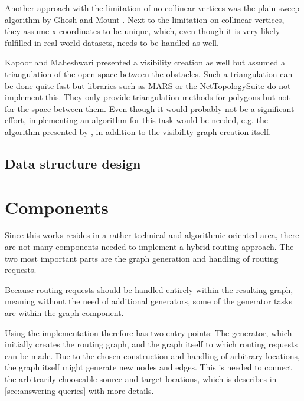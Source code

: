 			Another approach with the limitation of no collinear vertices was the plain-sweep algorithm by Ghosh and Mount \cite{ghosh-output-sensitive-vgraph}.
			Next to the limitation on collinear vertices, they assume x-coordinates to be unique, which, even though it is very likely fulfilled in real world datasets, needs to be handled as well.
			
			Kapoor and Maheshwari presented a visibility creation as well \cite{kapoor-shortest-path-vgraph} but assumed a triangulation of the open space between the obstacles.
			Such a triangulation can be done quite fast but libraries such as MARS or the NetTopologySuite do not implement this.
			They only provide triangulation methods for polygons but not for the space between them.
			Even though it would probably not be a significant effort, implementing an algorithm for this task would be needed, e.g. the algorithm presented by , in addition to the visibility graph creation itself.
	
	\subsection{Data structure design}
	
\section{Components}
\label{sec:components}

	Since this works resides in a rather technical and algorithmic oriented area, there are not many components needed to implement a hybrid routing approach.
	The two most important parts are the graph generation and handling of routing requests.
	
	Because routing requests should be handled entirely within the resulting graph, meaning without the need of additional generators, some of the generator tasks are within the graph component.
	
	Using the implementation therefore has two entry points:
	The generator, which initially creates the routing graph, and the graph itself to which routing requests can be made.
	Due to the chosen construction and handling of arbitrary locations, the graph itself might generate new nodes and edges.
	This is needed to connect the arbitrarily chooseable source and target locations, which is describes in \cref{sec:answering-queries} with more details.
	
